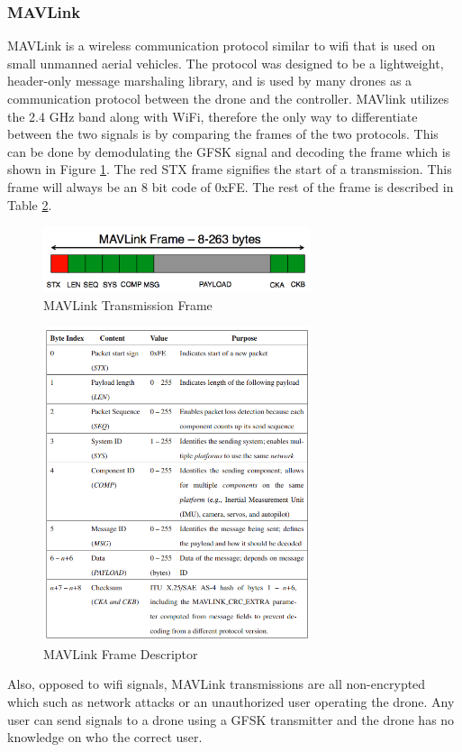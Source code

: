 \subsubsection{MAVLink}
MAVLink is a wireless communication protocol similar to wifi that is used on small unmanned aerial vehicles. The protocol was designed to be a lightweight, header-only message marshaling library, and is used by many drones as a communication protocol between the drone and the controller. MAVlink utilizes the 2.4 GHz band along with WiFi, therefore the only way to differentiate between the two signals is by comparing the frames of the two protocols. This can be done by demodulating the GFSK signal and decoding the frame which is shown in Figure \ref{fig:MAVlink_frame}. The red STX frame signifies the start of a transmission. This frame will always be an 8 bit code of 0xFE. The rest of the frame is described in Table \ref{fig:MAVlink_frame_table}.
\begin{figure}[ht]
\centering
\includegraphics[width=0.70\textwidth]{img/mavlink-packet.png}
\caption{MAVLink Transmission Frame}
\label{fig:MAVlink_frame}
\end{figure}
\begin{figure}[ht]
\centering
\includegraphics[width=0.70\textwidth]{img/MAVLink-Packet-Table.png}
\caption{MAVLink Frame Descriptor}
\label{fig:MAVlink_frame_table}
\end{figure}
\cite{mavlink_vuln}\par
Also, opposed to wifi signals, MAVLink transmissions are all non-encrypted which such as network attacks or an unauthorized user operating the drone. Any user can send signals to a drone using a GFSK transmitter and the drone has no knowledge on who the correct user.

